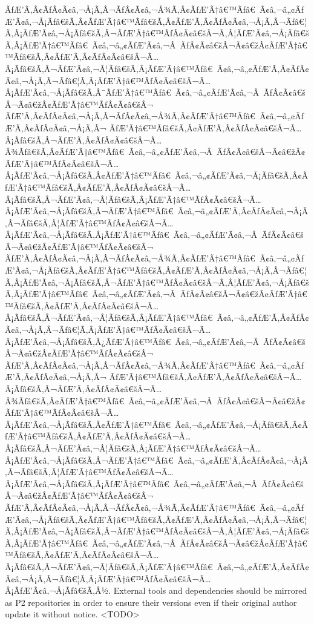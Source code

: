 \documentclass{gemoc} %
\begin{document}
ÃƒÆ’Ã‚Â¢ÃƒÂ¢Ã¢â‚¬Å¡Ã‚Â¬ÃƒÂ¢Ã¢â‚¬Å¾Ã‚Â¢ÃƒÆ’Ã†â€™Ãƒâ€ Ã¢â‚¬â„¢ÃƒÆ’Ã¢â‚¬Å¡Ãƒâ€šÃ‚Â¢ÃƒÆ’Ã†â€™Ãƒâ€šÃ‚Â¢ÃƒÆ’Ã‚Â¢ÃƒÂ¢Ã¢â‚¬Å¡Ã‚Â¬Ãƒâ€¦Ã‚Â¡ÃƒÆ’Ã¢â‚¬Å¡Ãƒâ€šÃ‚Â¬ÃƒÆ’Ã†â€™ÃƒÂ¢Ã¢â€šÂ¬Ã‚Â¦ÃƒÆ’Ã¢â‚¬Å¡Ãƒâ€šÃ‚Â¡ÃƒÆ’Ã†â€™Ãƒâ€ Ã¢â‚¬â„¢ÃƒÆ’Ã¢â‚¬Â ÃƒÂ¢Ã¢â€šÂ¬Ã¢â€žÂ¢ÃƒÆ’Ã†â€™Ãƒâ€šÃ‚Â¢ÃƒÆ’Ã‚Â¢ÃƒÂ¢Ã¢â€šÂ¬Ã…Â¡Ãƒâ€šÃ‚Â¬ÃƒÆ’Ã¢â‚¬Â¦Ãƒâ€šÃ‚Â¡ÃƒÆ’Ã†â€™Ãƒâ€ Ã¢â‚¬â„¢ÃƒÆ’Ã‚Â¢ÃƒÂ¢Ã¢â‚¬Å¡Ã‚Â¬Ãƒâ€¦Ã‚Â¡ÃƒÆ’Ã†â€™ÃƒÂ¢Ã¢â€šÂ¬Ã…Â¡ÃƒÆ’Ã¢â‚¬Å¡Ãƒâ€šÃ‚Â¯ÃƒÆ’Ã†â€™Ãƒâ€ Ã¢â‚¬â„¢ÃƒÆ’Ã¢â‚¬Â ÃƒÂ¢Ã¢â€šÂ¬Ã¢â€žÂ¢ÃƒÆ’Ã†â€™ÃƒÂ¢Ã¢â€šÂ¬ ÃƒÆ’Ã‚Â¢ÃƒÂ¢Ã¢â‚¬Å¡Ã‚Â¬ÃƒÂ¢Ã¢â‚¬Å¾Ã‚Â¢ÃƒÆ’Ã†â€™Ãƒâ€ Ã¢â‚¬â„¢ÃƒÆ’Ã‚Â¢ÃƒÂ¢Ã¢â‚¬Å¡Ã‚Â¬ ÃƒÆ’Ã†â€™Ãƒâ€šÃ‚Â¢ÃƒÆ’Ã‚Â¢ÃƒÂ¢Ã¢â€šÂ¬Ã…Â¡Ãƒâ€šÃ‚Â¬ÃƒÆ’Ã‚Â¢ÃƒÂ¢Ã¢â€šÂ¬Ã…Â¾Ãƒâ€šÃ‚Â¢ÃƒÆ’Ã†â€™Ãƒâ€ Ã¢â‚¬â„¢ÃƒÆ’Ã¢â‚¬Â ÃƒÂ¢Ã¢â€šÂ¬Ã¢â€žÂ¢ÃƒÆ’Ã†â€™ÃƒÂ¢Ã¢â€šÂ¬Ã…Â¡ÃƒÆ’Ã¢â‚¬Å¡Ãƒâ€šÃ‚Â¢ÃƒÆ’Ã†â€™Ãƒâ€ Ã¢â‚¬â„¢ÃƒÆ’Ã¢â‚¬Å¡Ãƒâ€šÃ‚Â¢ÃƒÆ’Ã†â€™Ãƒâ€šÃ‚Â¢ÃƒÆ’Ã‚Â¢ÃƒÂ¢Ã¢â€šÂ¬Ã…Â¡Ãƒâ€šÃ‚Â¬ÃƒÆ’Ã¢â‚¬Â¦Ãƒâ€šÃ‚Â¡ÃƒÆ’Ã†â€™ÃƒÂ¢Ã¢â€šÂ¬Ã…Â¡ÃƒÆ’Ã¢â‚¬Å¡Ãƒâ€šÃ‚Â¬ÃƒÆ’Ã†â€™Ãƒâ€ Ã¢â‚¬â„¢ÃƒÆ’Ã‚Â¢ÃƒÂ¢Ã¢â‚¬Å¡Ã‚Â¬Ãƒâ€šÃ‚Â¦ÃƒÆ’Ã†â€™ÃƒÂ¢Ã¢â€šÂ¬Ã…Â¡ÃƒÆ’Ã¢â‚¬Å¡Ãƒâ€šÃ‚Â¡ÃƒÆ’Ã†â€™Ãƒâ€ Ã¢â‚¬â„¢ÃƒÆ’Ã¢â‚¬Â ÃƒÂ¢Ã¢â€šÂ¬Ã¢â€žÂ¢ÃƒÆ’Ã†â€™ÃƒÂ¢Ã¢â€šÂ¬ ÃƒÆ’Ã‚Â¢ÃƒÂ¢Ã¢â‚¬Å¡Ã‚Â¬ÃƒÂ¢Ã¢â‚¬Å¾Ã‚Â¢ÃƒÆ’Ã†â€™Ãƒâ€ Ã¢â‚¬â„¢ÃƒÆ’Ã¢â‚¬Å¡Ãƒâ€šÃ‚Â¢ÃƒÆ’Ã†â€™Ãƒâ€šÃ‚Â¢ÃƒÆ’Ã‚Â¢ÃƒÂ¢Ã¢â‚¬Å¡Ã‚Â¬Ãƒâ€¦Ã‚Â¡ÃƒÆ’Ã¢â‚¬Å¡Ãƒâ€šÃ‚Â¬ÃƒÆ’Ã†â€™ÃƒÂ¢Ã¢â€šÂ¬Ã‚Â¦ÃƒÆ’Ã¢â‚¬Å¡Ãƒâ€šÃ‚Â¡ÃƒÆ’Ã†â€™Ãƒâ€ Ã¢â‚¬â„¢ÃƒÆ’Ã¢â‚¬Â ÃƒÂ¢Ã¢â€šÂ¬Ã¢â€žÂ¢ÃƒÆ’Ã†â€™Ãƒâ€šÃ‚Â¢ÃƒÆ’Ã‚Â¢ÃƒÂ¢Ã¢â€šÂ¬Ã…Â¡Ãƒâ€šÃ‚Â¬ÃƒÆ’Ã¢â‚¬Â¦Ãƒâ€šÃ‚Â¡ÃƒÆ’Ã†â€™Ãƒâ€ Ã¢â‚¬â„¢ÃƒÆ’Ã‚Â¢ÃƒÂ¢Ã¢â‚¬Å¡Ã‚Â¬Ãƒâ€¦Ã‚Â¡ÃƒÆ’Ã†â€™ÃƒÂ¢Ã¢â€šÂ¬Ã…Â¡ÃƒÆ’Ã¢â‚¬Å¡Ãƒâ€šÃ‚Â¿ÃƒÆ’Ã†â€™Ãƒâ€ Ã¢â‚¬â„¢ÃƒÆ’Ã¢â‚¬Â ÃƒÂ¢Ã¢â€šÂ¬Ã¢â€žÂ¢ÃƒÆ’Ã†â€™ÃƒÂ¢Ã¢â€šÂ¬ ÃƒÆ’Ã‚Â¢ÃƒÂ¢Ã¢â‚¬Å¡Ã‚Â¬ÃƒÂ¢Ã¢â‚¬Å¾Ã‚Â¢ÃƒÆ’Ã†â€™Ãƒâ€ Ã¢â‚¬â„¢ÃƒÆ’Ã‚Â¢ÃƒÂ¢Ã¢â‚¬Å¡Ã‚Â¬ ÃƒÆ’Ã†â€™Ãƒâ€šÃ‚Â¢ÃƒÆ’Ã‚Â¢ÃƒÂ¢Ã¢â€šÂ¬Ã…Â¡Ãƒâ€šÃ‚Â¬ÃƒÆ’Ã‚Â¢ÃƒÂ¢Ã¢â€šÂ¬Ã…Â¾Ãƒâ€šÃ‚Â¢ÃƒÆ’Ã†â€™Ãƒâ€ Ã¢â‚¬â„¢ÃƒÆ’Ã¢â‚¬Â ÃƒÂ¢Ã¢â€šÂ¬Ã¢â€žÂ¢ÃƒÆ’Ã†â€™ÃƒÂ¢Ã¢â€šÂ¬Ã…Â¡ÃƒÆ’Ã¢â‚¬Å¡Ãƒâ€šÃ‚Â¢ÃƒÆ’Ã†â€™Ãƒâ€ Ã¢â‚¬â„¢ÃƒÆ’Ã¢â‚¬Å¡Ãƒâ€šÃ‚Â¢ÃƒÆ’Ã†â€™Ãƒâ€šÃ‚Â¢ÃƒÆ’Ã‚Â¢ÃƒÂ¢Ã¢â€šÂ¬Ã…Â¡Ãƒâ€šÃ‚Â¬ÃƒÆ’Ã¢â‚¬Â¦Ãƒâ€šÃ‚Â¡ÃƒÆ’Ã†â€™ÃƒÂ¢Ã¢â€šÂ¬Ã…Â¡ÃƒÆ’Ã¢â‚¬Å¡Ãƒâ€šÃ‚Â¬ÃƒÆ’Ã†â€™Ãƒâ€ Ã¢â‚¬â„¢ÃƒÆ’Ã‚Â¢ÃƒÂ¢Ã¢â‚¬Å¡Ã‚Â¬Ãƒâ€šÃ‚Â¦ÃƒÆ’Ã†â€™ÃƒÂ¢Ã¢â€šÂ¬Ã…Â¡ÃƒÆ’Ã¢â‚¬Å¡Ãƒâ€šÃ‚Â¡ÃƒÆ’Ã†â€™Ãƒâ€ Ã¢â‚¬â„¢ÃƒÆ’Ã¢â‚¬Â ÃƒÂ¢Ã¢â€šÂ¬Ã¢â€žÂ¢ÃƒÆ’Ã†â€™ÃƒÂ¢Ã¢â€šÂ¬ ÃƒÆ’Ã‚Â¢ÃƒÂ¢Ã¢â‚¬Å¡Ã‚Â¬ÃƒÂ¢Ã¢â‚¬Å¾Ã‚Â¢ÃƒÆ’Ã†â€™Ãƒâ€ Ã¢â‚¬â„¢ÃƒÆ’Ã¢â‚¬Å¡Ãƒâ€šÃ‚Â¢ÃƒÆ’Ã†â€™Ãƒâ€šÃ‚Â¢ÃƒÆ’Ã‚Â¢ÃƒÂ¢Ã¢â‚¬Å¡Ã‚Â¬Ãƒâ€¦Ã‚Â¡ÃƒÆ’Ã¢â‚¬Å¡Ãƒâ€šÃ‚Â¬ÃƒÆ’Ã†â€™ÃƒÂ¢Ã¢â€šÂ¬Ã‚Â¦ÃƒÆ’Ã¢â‚¬Å¡Ãƒâ€šÃ‚Â¡ÃƒÆ’Ã†â€™Ãƒâ€ Ã¢â‚¬â„¢ÃƒÆ’Ã¢â‚¬Â ÃƒÂ¢Ã¢â€šÂ¬Ã¢â€žÂ¢ÃƒÆ’Ã†â€™Ãƒâ€šÃ‚Â¢ÃƒÆ’Ã‚Â¢ÃƒÂ¢Ã¢â€šÂ¬Ã…Â¡Ãƒâ€šÃ‚Â¬ÃƒÆ’Ã¢â‚¬Â¦Ãƒâ€šÃ‚Â¡ÃƒÆ’Ã†â€™Ãƒâ€ Ã¢â‚¬â„¢ÃƒÆ’Ã‚Â¢ÃƒÂ¢Ã¢â‚¬Å¡Ã‚Â¬Ãƒâ€¦Ã‚Â¡ÃƒÆ’Ã†â€™ÃƒÂ¢Ã¢â€šÂ¬Ã…Â¡ÃƒÆ’Ã¢â‚¬Å¡Ãƒâ€šÃ‚Â½.
\newline
External tools and dependencies should be mirrored as P2 repositories in order to ensure their versions even if their original author update it without notice.
\newline
\textless TODO\textgreater
\end{document}
